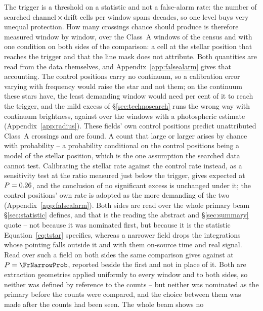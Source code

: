 The trigger is a threshold on a statistic and not a false-alarm rate: the
number of searched channel\,$\times$\,drift cells per window spans
\TuCellsDecades{} decades, so one level buys very unequal protection. How
many crossings chance should produce is therefore measured window by window,
over the \CeNWin{} Class~A windows of the census and with one condition on
both sides of the comparison: a cell at the stellar position that reaches the
trigger and that the line mask does not attribute. Both quantities are read from the data themselves, and
Appendix~\ref{app:falsealarm} gives that accounting. The control positions carry no continuum, so a calibration error varying
with frequency would raise the star and not them; on the continuum these
stars have, the least demanding window would need
\CyEpsMinPct{} per cent of it to reach the trigger, and the mild excess of
\S\ref{sec:technosearch} runs the wrong way with continuum brightness,
\CkRatioContBright{} against \CkRatioContFaint{} over the \CkNContWin{}
windows with a photospheric estimate (Appendix~\ref{app:radius}). These fields' own control positions predict \CeExp{} unattributed
Class~A crossings and \CeObs{} are found. A count that large or larger arises
by chance with probability \CeProbNull{} -- a probability conditional on the
control positions being a model of the stellar position, which is the one
assumption the searched data cannot test. Calibrating the stellar rate
against the control rate instead, as a sensitivity test at the ratio
\CeNear{} measured just below the trigger, gives \CeExpNear{} expected at
$P=0.26$, and the conclusion of no significant excess is unchanged
under it; the control positions' own rate is adopted as the more demanding of
the two (Appendix~\ref{app:falsealarm}). Both sides are read over the whole
primary beam \S\ref{sec:statistic} defines, and that is the reading the
abstract and \S\ref{sec:summary} quote -- not because it was nominated
first, but because it is the statistic Equation~\ref{eq:tstar} specifies,
whereas a narrower field drops the integrations whose pointing falls outside
it and with them on-source time and real signal. Read over such a field on
both sides the same comparison gives \FrNarrowObs{} against \FrNarrowExp{}
at $P=\FrNarrowProb$, reported beside the first and not in place of it. Both
are extraction geometries applied uniformly to every window and to both
sides, so neither was defined by reference to the counts -- but neither was
nominated as the primary before the counts were compared, and the choice
between them was made after the counts had been seen. The whole beam shows no
